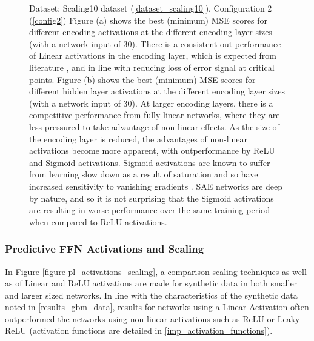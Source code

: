 \documentclass[a4paper,11pt,oneside]{article}
\theoremstyle{plain}
\theoremstyle{definition}
\begin{document}
\begin{figure}[H]
		\caption[MSE by Activations and Encoding Layer Size]{Dataset: Scaling10 dataset (\ref{dataset_scaling10}), Configuration 2 (\ref{config2})
			\newline Figure (a) shows the best (minimum) MSE scores for different encoding activations at the different encoding layer sizes (with a network input of 30). There is a consistent out performance of Linear activations in the encoding layer, which is expected from literature \cite{Hinton2}, and in line with reducing loss of error signal at critical points. 
			\newline Figure (b) shows the best (minimum) MSE scores for different hidden layer activations at the different encoding layer sizes (with a network input of 30). At larger encoding layers, there is a competitive performance from fully linear networks, where they are less pressured to take advantage of non-linear effects. As the size of the encoding layer is reduced, the advantages of non-linear activations become more apparent, with outperformance by ReLU and Sigmoid activations. Sigmoid activations are known to suffer from learning slow down as a result of saturation and so have increased sensitivity to vanishing gradients \cite{Glorot2}. SAE networks are deep by nature, and so it is not surprising that the Sigmoid activations are resulting in worse performance over the same training period when compared to ReLU activations. \newline}
		\label{figure-mse_encoding_activations}
	\end{figure}
	
	
	\subsubsection{Predictive FFN Activations and Scaling}
	
	In Figure \ref{figure-pl_activations_scaling}, a comparison scaling techniques as well as of Linear and ReLU activations are made for synthetic data in both smaller and larger sized networks. In line with the characteristics of the synthetic data noted in \ref{results_gbm_data}, results for networks using a Linear Activation often outperformed the networks using non-linear activations such as ReLU or Leaky ReLU (activation functions are detailed in \ref{imp_activation_functions}). \newline
	
\end{document}

